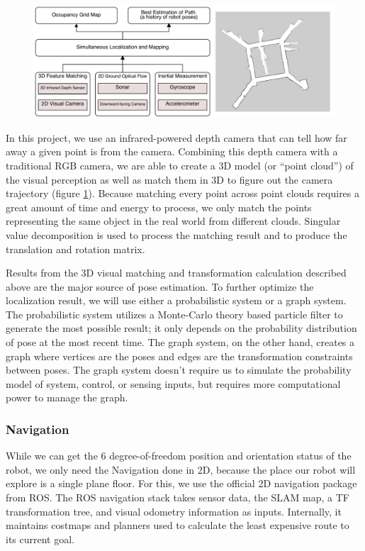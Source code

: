 \documentclass[12pt, letterpaper]{article}
\begin{document}
\begin{figure}[h]
\centering
\includegraphics[width=16cm]{images/SLAM.pdf}
\label{fig:slam}
\end{figure}

In this project, we use an infrared-powered depth camera that can tell how far away a given point is from the camera. Combining this depth camera with a traditional RGB camera, we are able to create a 3D model (or ``point cloud'') of the visual perception as well as match them in 3D to figure out the camera trajectory (figure \ref{fig:slam}). Because matching every point across point clouds requires a great amount of time and energy to process, we only match the points representing the same object in the real world from different clouds. Singular value decomposition is used to process the matching result and to produce the translation and rotation matrix.

Results from the 3D visual matching and transformation calculation described above are the major source of pose estimation. To further optimize the localization result, we will use either a probabilistic system or a graph system. The probabilistic system utilizes a Monte-Carlo theory based particle filter to generate the most possible result; it only depends on the probability distribution of pose at the most recent time. The graph system, on the other hand, creates a graph where vertices are the poses and edges are the transformation constraints between poses. The graph system doesn't require us to simulate the probability model of system, control, or sensing inputs, but requires more computational power to manage the graph.

\subsubsection{Navigation}

While we can get the 6 degree-of-freedom position and orientation status of the robot, we only need the Navigation done in 2D, because the place our robot will explore is a single plane floor. For this, we use the official 2D navigation package from ROS.  The ROS navigation stack takes sensor data, the SLAM map, a TF transformation tree, and visual odometry information as inputs.  Internally, it maintains costmaps and planners used to calculate the least expensive route to its current goal.
\end{document}
